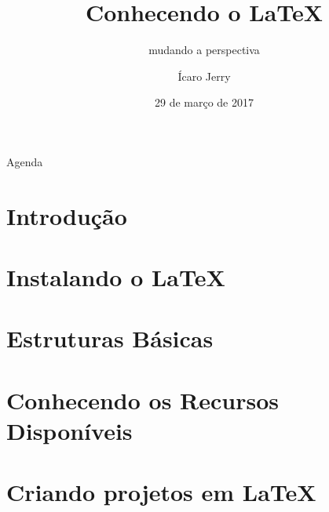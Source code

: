 \documentclass{beamer}
\title{Conhecendo o \LaTeX}
\subtitle{mudando a perspectiva}
\author{Ícaro Jerry}
\date{29 de março de 2017}
\institute{Instituto Federal da Bahia\\
campus Salvador\\
\url{icarojerry@ifba.edu.br}
}
\begin{document}
\begin{frame}[t]
	\maketitle
\end{frame}

\begin{frame}[t]{Agenda}
\tableofcontents
\end{frame}

\def\sectionname{}
\def\insertsectionnumber{}
\def\subsectionname{}
\def\insertsubsectionnumber{}

\AtBeginSection{\frame{\sectionpage}\addtocounter{framenumber}{-1}}


\AtBeginSubsection{\frame{\subsectionpage}\addtocounter{framenumber}{-1} }
\AtBeginSubsubsection{\frame{\subsubsectionpage}\addtocounter{framenumber}{-1} }






\section{Introdução}


\section{Instalando o \LaTeX}


\section{Estruturas Básicas}


\section{Conhecendo os Recursos Disponíveis}


\section{Criando projetos em \LaTeX}



\end{document}
